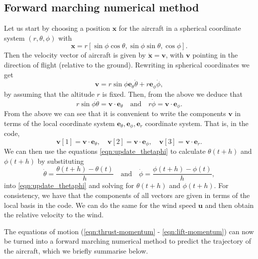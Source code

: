 \documentclass{article}
\renewcommand{\vec}[1]{\boldsymbol{#1}}
\begin{document}
\subsection{Forward marching numerical method}

Let us start by choosing a position $\vec x$ for the aircraft in a spherical coordinate system $(r,\theta,\phi)$ with
\[
\vec x = r [ \sin \phi \cos \theta, \sin \phi \sin \theta,   \cos \phi].
\]
Then the velocity vector of aircraft is given by $\dot{\vec x} = \vec v$, with $\vec v$ pointing in the direction of flight (relative to the ground). Rewriting in spherical coordinates we get
\[
\vec v = r \sin \phi  {\vec e_\theta} \dot \theta + r  {\vec e_\phi} \dot \phi, 
\]
by assuming that the altitude $r$ is fixed. Then, from the above we deduce that
\begin{equation} \label{eqn:update_thetaphi}
    r \sin \phi \dot \theta = \vec v \cdot {\vec e}_\theta  \quad \text{and} \quad 
r \dot \phi = \vec v \cdot {\vec e}_\phi.
\end{equation}
From the above we can see that it is convenient to write the components $\vec v$ in terms of the local coordinate system ${\vec e}_\theta, {\vec e}_\phi, {\vec e}_r$ coordinate system. That is, in the code, 
\[
\vec v[1] = \vec v \cdot {\vec e}_\theta, \quad 
\vec v[2] = \vec v \cdot {\vec e}_\phi, 
\quad 
\vec v[3] = \vec v \cdot {\vec e}_r.
\]
We can then use the equations \eqref{eqn:update_thetaphi}  to calculate $\theta(t+h)$ and $\phi(t+h)$ by substituting 
\[
\dot \theta = \frac{ \theta(t+h) - \theta(t)}{h} \quad \text{and} \quad 
\dot \phi = \frac{ \phi(t+h) - \phi(t)}{h},
\]
into \eqref{eqn:update_thetaphi} and solving for $\theta(t+h)$ and $\phi(t+h)$. For consistency, we have that the components of all vectors are given in terms of the local basis in the code. We can do the same for the wind speed $\vec u$ and then obtain the relative velocity to the wind.

The equations of motion (\ref{eqn:thrust-momentum} - \ref{eqn:lift-momentum}) can now be turned into a forward marching numerical method to predict the trajectory of the aircraft, which we briefly summarise below.
\end{document}
